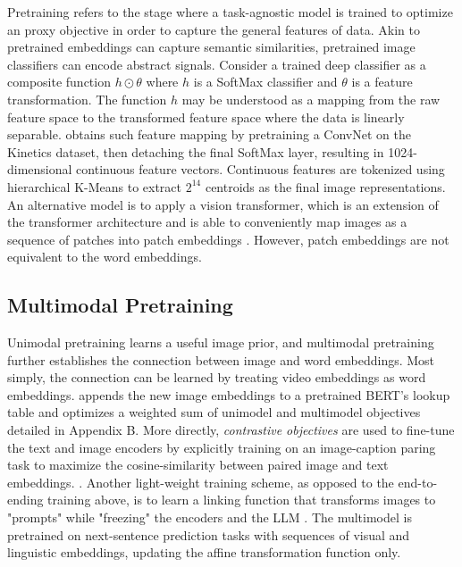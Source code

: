 \documentclass[11pt]{article}
\begin{document}
Pretraining refers to the stage where a task-agnostic model is trained to optimize an proxy objective in order to capture the general features of data. Akin to pretrained embeddings can capture semantic similarities, pretrained image classifiers can encode abstract signals. Consider a trained deep classifier as a composite function $h \odot \theta$ where $h$ is a SoftMax classifier and $\theta$ is a feature transformation. The function $h$ may be understood as a mapping from the raw feature space to the transformed feature space where the data is linearly separable. \citet{DBLP:conf/iccv/SunMV0S19} obtains such feature mapping by pretraining a ConvNet on the Kinetics dataset, then detaching the final SoftMax layer, resulting in 1024-dimensional continuous feature vectors. Continuous features are tokenized using hierarchical K-Means to extract $2^{14}$ centroids as the final image representations. An alternative model is to apply a vision transformer, which is an extension of the transformer architecture and is able to conveniently map images as a sequence of patches into patch embeddings \citep{DBLP:conf/iclr/DosovitskiyB0WZ21, DBLP:conf/icml/DriessXSLCIWTVY23, DBLP:conf/icml/RadfordKHRGASAM21}. However, patch embeddings are not equivalent to the word embeddings. 

\subsection{Multimodal Pretraining}
Unimodal pretraining learns a useful image prior, and multimodal pretraining further establishes the connection between image and word embeddings. Most simply, the connection can be learned by treating video embeddings as word embeddings. \citet{DBLP:conf/iccv/SunMV0S19} appends the new image embeddings to a pretrained BERT's lookup table and optimizes a weighted sum of unimodel and multimodel objectives detailed in Appendix B. More directly, \textit{contrastive objectives} are used to fine-tune the text and image encoders by explicitly training on an image-caption paring task to maximize the cosine-similarity between paired image and text embeddings. \citep{DBLP:conf/icml/RadfordKHRGASAM21}. Another light-weight training scheme, as opposed to the end-to-ending training above, is to learn a linking function that transforms images to "prompts" while "freezing" the encoders and the LLM \citep{DBLP:conf/icml/DriessXSLCIWTVY23}. The multimodel is pretrained on next-sentence prediction tasks with sequences of visual and linguistic embeddings, updating the affine transformation function only.
\end{document}
